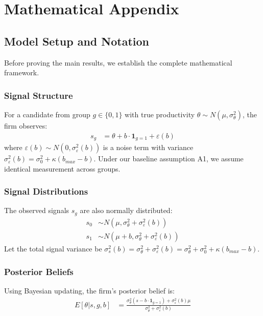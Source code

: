 \section{Mathematical Appendix}

\subsection{Model Setup and Notation}

Before proving the main results, we establish the complete mathematical framework.

\subsubsection{Signal Structure}
For a candidate from group $g \in \{0,1\}$ with true productivity $\theta \sim N(\mu, \sigma_\theta^2)$, the firm observes:
\begin{align}
s_g &= \theta + b \cdot \mathbf{1}_{g=1} + \varepsilon(b)
\end{align}
where $\varepsilon(b) \sim N(0, \sigma_\varepsilon^2(b))$ is a noise term with variance $\sigma_\varepsilon^2(b) = \sigma_0^2 + \kappa(b_{max} - b)$. Under our baseline assumption A1, we assume identical measurement across groups.

\subsubsection{Signal Distributions}
The observed signals $s_g$ are also normally distributed:
\begin{align}
s_0 &\sim N(\mu, \sigma_\theta^2 + \sigma_\varepsilon^2(b)) \\
s_1 &\sim N(\mu + b, \sigma_\theta^2 + \sigma_\varepsilon^2(b))
\end{align}
Let the total signal variance be $\sigma_s^2(b) = \sigma_\theta^2 + \sigma_\varepsilon^2(b) = \sigma_\theta^2 + \sigma_0^2 + \kappa(b_{max} - b)$.

\subsubsection{Posterior Beliefs}
Using Bayesian updating, the firm's posterior belief is:
\begin{align}
E[\theta | s, g, b] &= \frac{\sigma_\theta^2 (s - b \cdot \mathbf{1}_{g=1}) + \sigma_\varepsilon^2(b) \mu}{\sigma_\theta^2 + \sigma_\varepsilon^2(b)} \label{eq:posterior_appendix}
\end{align}

